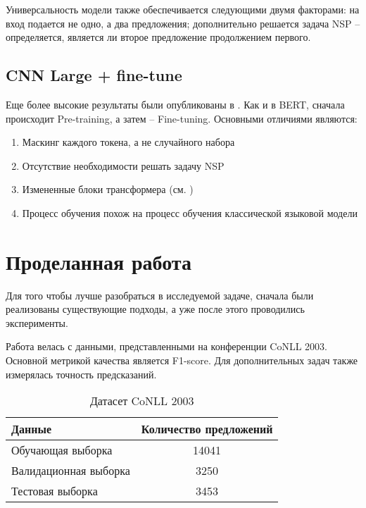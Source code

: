 \documentclass[a4paper,14pt]{extarticle}
\begin{document}

Универсальность модели также обеспечивается следующими двумя факторами: на вход подается не одно, а два предложения; дополнительно решается задача NSP -- определяется, является ли второе предложение продолжением первого.


\clearpage

\subsection{CNN Large + fine-tune}

Еще более высокие результаты были опубликованы в \cite{1903.07785}. Как и в BERT, сначала происходит Pre-training, а затем -- Fine-tuning. Основными отличиями являются:
\begin{enumerate}
    \item Маскинг каждого токена, а не случайного набора
    \item Отсутствие необходимости решать задачу NSP
    \item Измененные блоки трансформера (см. \cite{1706.03762})
    \item Процесс обучения похож на процесс обучения классической языковой модели
\end{enumerate}

\clearpage

\section{Проделанная работа}

Для того чтобы лучше разобраться в исследуемой задаче, сначала были реализованы существующие подходы, а уже после этого проводились эксперименты.

Работа велась с данными, представленными на конференции CoNLL 2003. Основной метрикой качества является F1-score. Для дополнительных задач также измерялась точность предсказаний.

\begin{table}[H]
    \caption{Датасет CoNLL 2003}
    \label{progress}
    \begin{center}
    \begin{tabular}{l|c}
        Данные                & Количество предложений \\
        \hline
        Обучающая выборка     & 14041                  \\
        Валидационная выборка & 3250                   \\
        Тестовая выборка      & 3453                   \\
    \end{tabular}
    \end{center}
\end{table}
\end{document}

